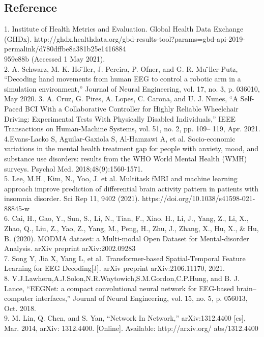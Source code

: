 \documentclass[a0,portrait]{a0poster}
\begin{document}
\begin{minipage}[c]{\linewidth}
\begin{framed}
\begin{multicols}{2}
\section*{Reference}
\tiny \textnormal{1. Institute of Health Metrics and Evaluation. Global Health Data Exchange (GHDx).  http://ghdx.healthdata.org/gbd-results-tool?params=gbd-api-2019-permalink/d780dffbe8a381b25e1416884\\959e88b (Accessed 1 May 2021).}\\
\tiny \textnormal{2. A. Schwarz, M. K. Ho ̈ller, J. Pereira, P. Ofner, and G. R. Mu ̈ller-Putz, “Decoding hand movements from human EEG to control a robotic arm in a simulation environment,” Journal of Neural Engineering, vol. 17, no. 3, p. 036010, May 2020.}
\tiny \textnormal{3. A. Cruz, G. Pires, A. Lopes, C. Carona, and U. J. Nunes, “A Self-Paced BCI With a Collaborative Controller for Highly Reliable Wheelchair Driving: Experimental Tests With Physically Disabled Individuals,” IEEE Transactions on Human-Machine Systems, vol. 51, no. 2, pp. 109– 119, Apr. 2021.}\\
 \tiny \textnormal{4.Evans-Lacko S, Aguilar-Gaxiola S, Al-Hamzawi A, et al. Socio-economic variations in the mental health treatment gap for people with anxiety, mood, and substance use disorders: results from the WHO World Mental Health (WMH) surveys. Psychol Med. 2018;48(9):1560-1571. }\\
 \tiny \textnormal{5. Lee, M.H., Kim, N., Yoo, J. et al. Multitask fMRI and machine learning approach improve prediction of differential brain activity pattern in patients with insomnia disorder. Sci Rep 11, 9402 (2021). https://doi.org/10.1038/s41598-021-88845-w}\\
 \tiny \textnormal{6. Cai, H., Gao, Y., Sun, S., Li, N., Tian, F., Xiao, H., Li, J., Yang, Z., Li, X., Zhao, Q., Liu, Z., Yao, Z., Yang, M., Peng, H., Zhu, J., Zhang, X., Hu, X., \& Hu, B. (2020). MODMA dataset: a Multi-modal Open Dataset for Mental-disorder Analysis. arXiv preprint arXiv:2002.09283 }\\
 \tiny \textnormal{7. Song Y, Jia X, Yang L, et al. Transformer-based Spatial-Temporal Feature Learning for EEG Decoding[J]. arXiv preprint arXiv:2106.11170, 2021.}\\
 \tiny \textnormal{8. V.J.Lawhern,A.J.Solon,N.R.Waytowich,S.M.Gordon,C.P.Hung, and B. J. Lance, “EEGNet: a compact convolutional neural network for EEG-based brain–computer interfaces,” Journal of Neural Engineering, vol. 15, no. 5, p. 056013, Oct. 2018.}\\
 \tiny \textnormal{9. M. Lin, Q. Chen, and S. Yan, “Network In Network,” arXiv:1312.4400 [cs], Mar. 2014, arXiv: 1312.4400. [Online]. Available: http://arxiv.org/ abs/1312.4400}
\end{multicols}
\vspace{0.5cm}
\end{framed}
\end{minipage}
\end{document}
